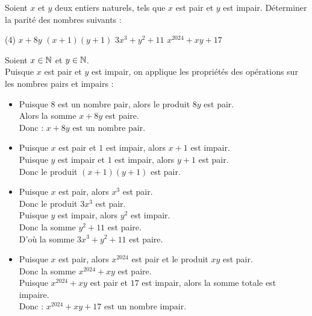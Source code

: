 \documentclass[10pt, a4paper]{article}
\begin{document}
\begin{Application}[][15 min]
Soient $x$  et $y$ deux entiers naturels, tels que $x$ est pair et $y$ est impair. Déterminer la parité des nombres suivants :
\vspace{0.3cm}
\begin{center}
\begin{tasks}[label=$\bullet$, label-width=10pt, item-indent=25pt](4)
    \task $x + 8y$
    \task $(x + 1)(y + 1)$
    \task $3x^3 + y^2 + 11$
    \task $x^{2024} + xy + 17$
\end{tasks}
\end{center}
\end{Application}



\begin{Solution}[APPLICATION][2]
Soient $x \in \mathbb{N}$ et $y \in \mathbb{N}$. \\
Puisque $x$ est pair et $y$ est impair, on applique les propriétés des opérations sur les nombres pairs et impairs :
\begin{itemize}[leftmargin=*,itemsep=0.5pt]
    \item Puisque $8$ est un nombre pair, alors le produit $8y$ est pair. \\
    Alors la somme $x + 8y$ est paire. \\
    Donc : \quad $x + 8y \text{ est un nombre pair.}$
    
    \item Puisque $x$ est pair et $1$ est impair, alors $x + 1$ est impair. \\
    Puisque $y$ est impair et $1$ est impair, alors $y + 1$ est pair. \\
    Donc le produit $(x + 1)(y + 1)$ est pair. 
    
    \item Puisque $x$ est pair, alors $x^3$ est pair. \\
    Donc le produit $3x^3$ est pair. \\
    Puisque $y$ est impair, alors $y^2$ est impair. \\
    Donc la somme $y^2 + 11$ est paire. \\
    D'où la somme $3x^3 + y^2 + 11$ est paire. 
    
    \item Puisque $x$ est pair, alors $x^{2024}$ est pair et le produit $xy$ est pair. \\
    Donc la somme $x^{2024} + xy$ est paire. \\
    Puisque $x^{2024} + xy$ est pair et $17$ est impair, alors la somme totale est impaire. \\
    Donc : \quad $x^{2024} + xy + 17 \text{ est un nombre impair.}$
\end{itemize}
\end{Solution}
\end{document}

